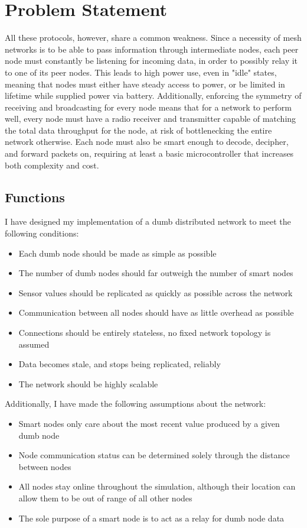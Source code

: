 \documentclass{article}
\begin{document}
\section{Problem Statement}

All these protocols, however, share a common weakness. Since a necessity of mesh networks is to be able to pass information through intermediate nodes, each peer node must constantly be listening for incoming data, in order to possibly relay it to one of its peer nodes. This leads to high power use, even in "idle" states, meaning that nodes must either have steady access to power, or be limited in lifetime while supplied power via battery. Additionally, enforcing the symmetry of receiving and broadcasting for every node means that for a network to perform well, every node must have a radio receiver and transmitter capable of matching the total data throughput for the node, at risk of bottlenecking the entire network otherwise. Each node must also be smart enough to decode, decipher, and forward packets on, requiring at least a basic microcontroller that increases both complexity and cost.

\subsection{Functions}
I have designed my implementation of a dumb distributed network to meet the following conditions:
\begin{itemize}
	\item Each dumb node should be made as simple as possible
	\item The number of dumb nodes should far outweigh the number of smart nodes
	\item Sensor values should be replicated as quickly as possible across the network
	\item Communication between all nodes should have as little overhead as possible
	\item Connections should be entirely stateless, no fixed network topology is assumed
	\item Data becomes stale, and stops being replicated, reliably
	\item The network should be highly scalable
\end{itemize}

\noindent
Additionally, I have made the following assumptions about the network:
\begin{itemize}
	\item Smart nodes only care about the most recent value produced by a given dumb node
	\item Node communication status can be determined solely through the distance between nodes
	\item All nodes stay online throughout the simulation, although their location can allow them to be out of range of all other nodes
	\item The sole purpose of a smart node is to act as a relay for dumb node data
\end{itemize}
\end{document}
